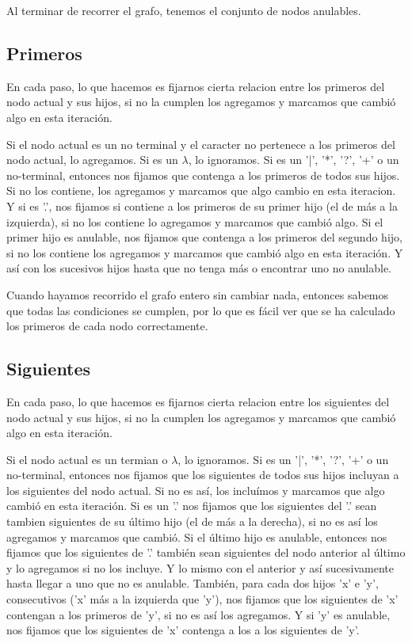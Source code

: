 \documentclass[a4paper]{report}
\begin{document}
	Al terminar de recorrer el grafo, tenemos el conjunto de nodos
anulables.

\subsection*{Primeros}

	En cada paso, lo que hacemos es fijarnos cierta relacion entre los primeros
del nodo actual y sus hijos, si no la cumplen los agregamos y marcamos que
cambió algo en esta iteración.


	Si el nodo actual es un no terminal y el caracter no pertenece a los
primeros del nodo actual, lo agregamos. Si es un $\lambda$, lo ignoramos. Si es un
'|', '*', '?', '+' o un no-terminal, entonces nos fijamos que contenga a los
primeros de todos sus hijos. Si no los contiene, los agregamos y marcamos que
algo cambio en esta iteracion. Y si es '.', nos fijamos si contiene a los
primeros de su primer hijo (el de más a la izquierda), si no los contiene lo
agregamos y marcamos que cambió algo. Si el primer hijo es anulable, nos fijamos
que contenga a los primeros del segundo hijo, si no los contiene los agregamos y
marcamos que cambió algo en esta iteración. Y así con los sucesivos hijos hasta
que no tenga más o encontrar uno no anulable.


	Cuando hayamos recorrido el grafo entero sin cambiar nada, entonces
sabemos que todas las condiciones se cumplen, por lo que es fácil ver que se ha
calculado los primeros de cada nodo correctamente.


\subsection*{Siguientes}

	En cada paso, lo que hacemos es fijarnos cierta relacion entre los
siguientes del nodo actual y sus hijos, si no la cumplen los agregamos y marcamos que
cambió algo en esta iteración.


	Si el nodo actual es un termian o $\lambda$, lo ignoramos. Si es un '|',
'*', '?', '+' o un no-terminal, entonces nos fijamos que los siguientes de todos
sus hijos incluyan a los siguientes del nodo actual. Si no es así, los incluímos
y marcamos que algo cambió en esta iteración. Si es un '.' nos fijamos que los
siguientes del '.' sean tambien siguientes de su último hijo (el de más a la
derecha), si no es así los agregamos y marcamos que cambió. Si el último hijo es
anulable, entonces nos fijamos que los siguientes de '.' también sean siguientes
del nodo anterior al último y lo agregamos si no los incluye. Y lo mismo con el
anterior y así sucesivamente hasta llegar a uno que no es anulable. También,
para cada dos hijos 'x' e 'y', consecutivos ('x' más a la izquierda que 'y'),
nos fijamos que los siguientes de 'x' contengan a los primeros de 'y', si no es
así los agregamos. Y si 'y' es anulable, nos fijamos que los siguientes de 'x'
contenga a los a los siguientes de 'y'.
\end{document}
